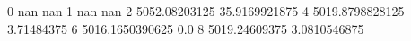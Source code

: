0 nan nan
1 nan nan
2 5052.08203125 35.9169921875
4 5019.8798828125 3.71484375
6 5016.1650390625 0.0
8 5019.24609375 3.0810546875
